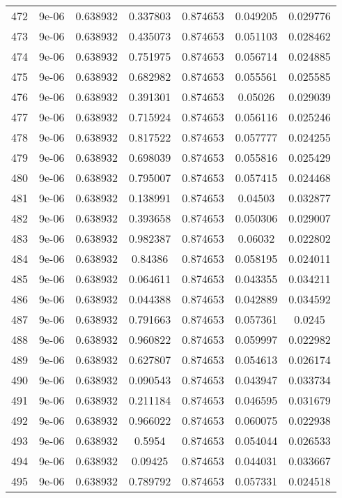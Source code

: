 \begin{table}
\begin{tabular*}{\linewidth}{c|c|c|c|c|c|c}
472 & 9e-06 & 0.638932 & 0.337803 & 0.874653 & 0.049205 & 0.029776\\
473 & 9e-06 & 0.638932 & 0.435073 & 0.874653 & 0.051103 & 0.028462\\
474 & 9e-06 & 0.638932 & 0.751975 & 0.874653 & 0.056714 & 0.024885\\
475 & 9e-06 & 0.638932 & 0.682982 & 0.874653 & 0.055561 & 0.025585\\
476 & 9e-06 & 0.638932 & 0.391301 & 0.874653 & 0.05026 & 0.029039\\
477 & 9e-06 & 0.638932 & 0.715924 & 0.874653 & 0.056116 & 0.025246\\
478 & 9e-06 & 0.638932 & 0.817522 & 0.874653 & 0.057777 & 0.024255\\
479 & 9e-06 & 0.638932 & 0.698039 & 0.874653 & 0.055816 & 0.025429\\
480 & 9e-06 & 0.638932 & 0.795007 & 0.874653 & 0.057415 & 0.024468\\
481 & 9e-06 & 0.638932 & 0.138991 & 0.874653 & 0.04503 & 0.032877\\
482 & 9e-06 & 0.638932 & 0.393658 & 0.874653 & 0.050306 & 0.029007\\
483 & 9e-06 & 0.638932 & 0.982387 & 0.874653 & 0.06032 & 0.022802\\
484 & 9e-06 & 0.638932 & 0.84386 & 0.874653 & 0.058195 & 0.024011\\
485 & 9e-06 & 0.638932 & 0.064611 & 0.874653 & 0.043355 & 0.034211\\
486 & 9e-06 & 0.638932 & 0.044388 & 0.874653 & 0.042889 & 0.034592\\
487 & 9e-06 & 0.638932 & 0.791663 & 0.874653 & 0.057361 & 0.0245\\
488 & 9e-06 & 0.638932 & 0.960822 & 0.874653 & 0.059997 & 0.022982\\
489 & 9e-06 & 0.638932 & 0.627807 & 0.874653 & 0.054613 & 0.026174\\
490 & 9e-06 & 0.638932 & 0.090543 & 0.874653 & 0.043947 & 0.033734\\
491 & 9e-06 & 0.638932 & 0.211184 & 0.874653 & 0.046595 & 0.031679\\
492 & 9e-06 & 0.638932 & 0.966022 & 0.874653 & 0.060075 & 0.022938\\
493 & 9e-06 & 0.638932 & 0.5954 & 0.874653 & 0.054044 & 0.026533\\
494 & 9e-06 & 0.638932 & 0.09425 & 0.874653 & 0.044031 & 0.033667\\
495 & 9e-06 & 0.638932 & 0.789792 & 0.874653 & 0.057331 & 0.024518\\
\end{tabular*}
\end{table}
